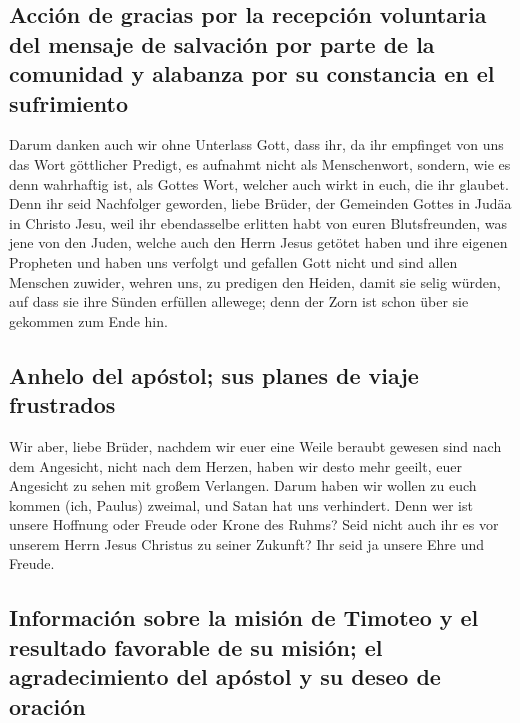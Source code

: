 \hypertarget{acciuxf3n-de-gracias-por-la-recepciuxf3n-voluntaria-del-mensaje-de-salvaciuxf3n-por-parte-de-la-comunidad-y-alabanza-por-su-constancia-en-el-sufrimiento}{%
\subsection{Acción de gracias por la recepción voluntaria del mensaje de
salvación por parte de la comunidad y alabanza por su constancia en el
sufrimiento}\label{acciuxf3n-de-gracias-por-la-recepciuxf3n-voluntaria-del-mensaje-de-salvaciuxf3n-por-parte-de-la-comunidad-y-alabanza-por-su-constancia-en-el-sufrimiento}}

 Darum danken auch wir ohne Unterlass Gott, dass ihr, da
ihr empfinget von uns das Wort göttlicher Predigt, es aufnahmt nicht als
Menschenwort, sondern, wie es denn wahrhaftig ist, als Gottes Wort,
welcher auch wirkt in euch, die ihr glaubet.  Denn ihr
seid Nachfolger geworden, liebe Brüder, der Gemeinden Gottes in Judäa in
Christo Jesu, weil ihr ebendasselbe erlitten habt von euren
Blutsfreunden, was jene von den Juden,  welche auch den
Herrn Jesus getötet haben und ihre eigenen Propheten und haben uns
verfolgt und gefallen Gott nicht und sind allen Menschen zuwider,
 wehren uns, zu predigen den Heiden, damit sie selig
würden, auf dass sie ihre Sünden erfüllen allewege; denn der Zorn ist
schon über sie gekommen zum Ende hin.

\hypertarget{anhelo-del-apuxf3stol-sus-planes-de-viaje-frustrados}{%
\subsection{Anhelo del apóstol; sus planes de viaje
frustrados}\label{anhelo-del-apuxf3stol-sus-planes-de-viaje-frustrados}}

 Wir aber, liebe Brüder, nachdem wir euer eine Weile
beraubt gewesen sind nach dem Angesicht, nicht nach dem Herzen, haben
wir desto mehr geeilt, euer Angesicht zu sehen mit großem Verlangen.
 Darum haben wir wollen zu euch kommen (ich, Paulus)
zweimal, und Satan hat uns verhindert.  Denn wer ist
unsere Hoffnung oder Freude oder Krone des Ruhms? Seid nicht auch ihr es
vor unserem Herrn Jesus Christus zu seiner Zukunft?  Ihr
seid ja unsere Ehre und Freude.

\hypertarget{informaciuxf3n-sobre-la-misiuxf3n-de-timoteo-y-el-resultado-favorable-de-su-misiuxf3n-el-agradecimiento-del-apuxf3stol-y-su-deseo-de-oraciuxf3n}{%
\subsection{Información sobre la misión de Timoteo y el resultado
favorable de su misión; el agradecimiento del apóstol y su deseo de
oración}\label{informaciuxf3n-sobre-la-misiuxf3n-de-timoteo-y-el-resultado-favorable-de-su-misiuxf3n-el-agradecimiento-del-apuxf3stol-y-su-deseo-de-oraciuxf3n}}

